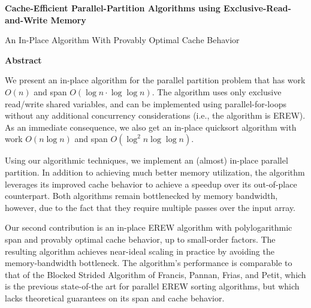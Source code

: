 \documentclass[sigplan, 10pt, nonacm]{acmart}
\theoremstyle{remark}
\theoremstyle{remark}
\begin{document}
\begin{titlepage}
\begin{center}
  \vspace*{1cm}

  {\Huge \textbf{Cache-Efficient Parallel-Partition Algorithms using Exclusive-Read-and-Write Memory}}

  \vspace{0.5cm}
  {\LARGE An In-Place Algorithm With Provably Optimal Cache Behavior}
  \vspace{4cm}
\end{center}

\begin{center}
\textbf{Abstract}
\end{center}

We present an in-place algorithm for the parallel partition problem that has
work $O(n)$ and span $O(\log n \cdot \log \log n)$. The algorithm uses only
exclusive read/write shared variables, and can be implemented using
parallel-for-loops without any additional concurrency considerations (i.e., the
algorithm is EREW). As an immediate consequence, we also get an in-place
quicksort algorithm with work $O(n \log n)$ and span $O(\log^2 n \log \log n)$.

Using our algorithmic techniques, we implement an (almost) in-place parallel
partition. In addition to achieving much better memory utilization, the
algorithm leverages its improved cache behavior to achieve a speedup over its
out-of-place counterpart. Both algorithms remain bottlenecked by memory
bandwidth, however, due to the fact that they require multiple passes over the
input array.

Our second contribution is an in-place EREW algorithm with polylogarithmic span
and provably optimal cache behavior, up to small-order factors.  The resulting
algorithm achieves near-ideal scaling in practice by avoiding the
memory-bandwidth bottleneck. The algorithm's performance is comparable to that of
the Blocked Strided Algorithm of Francis, Pannan, Frias, and Petit, which is
the previous state-of-the art for parallel EREW sorting algorithms, but which
lacks theoretical guarantees on its span and cache behavior.
 
\end{titlepage}



\title[]{}

\end{document}
